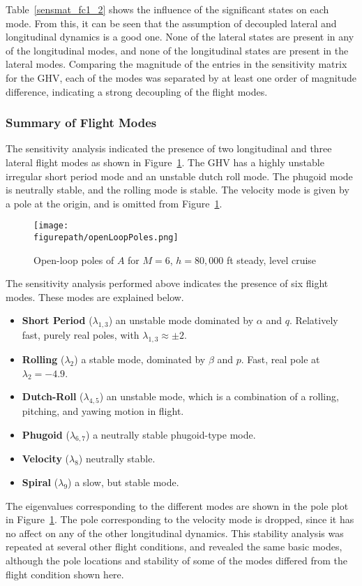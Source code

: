 Table~\ref{sensmat_fc1_2} shows the influence of the significant states on each mode.
From this, it can be seen that the assumption of decoupled lateral and longitudinal dynamics is a good one.
None of the lateral states are present in any of the longitudinal modes, and none of the longitudinal states are present in the lateral modes.
Comparing the magnitude of the entries in the sensitivity matrix for the GHV, each of the modes was separated by at least one order of magnitude difference, indicating a strong decoupling of the flight modes.

\subsubsection{Summary of Flight Modes}

The sensitivity analysis indicated the presence of two longitudinal and three lateral flight modes as shown in Figure~\ref{fig:poleplot}.
The GHV has a highly unstable irregular short period mode and an unstable dutch roll mode.
The phugoid mode is neutrally stable, and the rolling mode is stable.
The velocity mode is given by a pole at the origin, and is omitted from Figure~\ref{fig:poleplot}.

\begin{figure}[H]
  \centering
  \texttt{[image: \\figurepath/openLoopPoles.png]}
  \caption{Open-loop poles of $A$ for $M=6$, $h=80,000$ ft steady, level cruise\label{fig:poleplot}}
\end{figure}

The sensitivity analysis performed above indicates the presence of six flight modes.
These modes are explained below.
\begin{itemize}\itemsep2pt
  \item{\textbf{Short Period} ($\lambda_{1,3}$) \textemdash{} an unstable mode dominated by $\alpha$ and $q$. Relatively fast, purely real poles, with $\lambda_{1,3}\approx\pm2$.}
  \item{\textbf{Rolling} ($\lambda_{2}$) \textemdash{} a stable mode, dominated by $\beta$ and $p$. Fast, real pole at $\lambda_{2}=-4.9$.}
  \item{\textbf{Dutch-Roll} ($\lambda_{4,5}$) \textemdash{} an unstable mode, which is a combination of a rolling, pitching, and yawing motion in flight.}
  \item{\textbf{Phugoid} ($\lambda_{6,7}$) \textemdash{} a neutrally stable phugoid-type mode.}
  \item{\textbf{Velocity} ($\lambda_{8}$) \textemdash{} neutrally stable.}
  \item{\textbf{Spiral} ($\lambda_{9}$) \textemdash{} a slow, but stable mode.}
\end{itemize}
The eigenvalues corresponding to the different modes are shown in the pole plot in Figure~\ref{fig:poleplot}.
The pole corresponding to the velocity mode is dropped, since it has no affect on any of the other longitudinal dynamics.
This stability analysis was repeated at several other flight conditions, and revealed the same basic modes, although the pole locations and stability of some of the modes differed from the flight condition shown here.

